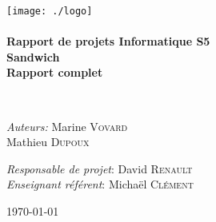 \begin{titlepage}
\begin{center}

\texttt{[image: ./logo]}~\\[1cm]

\HRule \\[0.4cm]

{\Huge \bfseries Rapport de projets Informatique S5\\
Sandwich \\[0.4cm] }
{\Large \bfseries Rapport complet \\[0.4cm] }

\HRule \\[1.5cm]

\begin{minipage}{0.4\textwidth}
\begin{flushleft} \large
\emph{Auteurs:} Marine \textsc{Vovard}\\
Mathieu \textsc{Dupoux}\\
\end{flushleft}
\end{minipage}
\begin{minipage}{0.5\textwidth}
\begin{flushright} \large
\emph{Responsable de projet}:
David \textsc{Renault}\\
\emph{Enseignant référent}:
Michaël \textsc{Clément}
\end{flushright}
\end{minipage}

\vfill

{\large \today}

\end{center}
\end{titlepage}